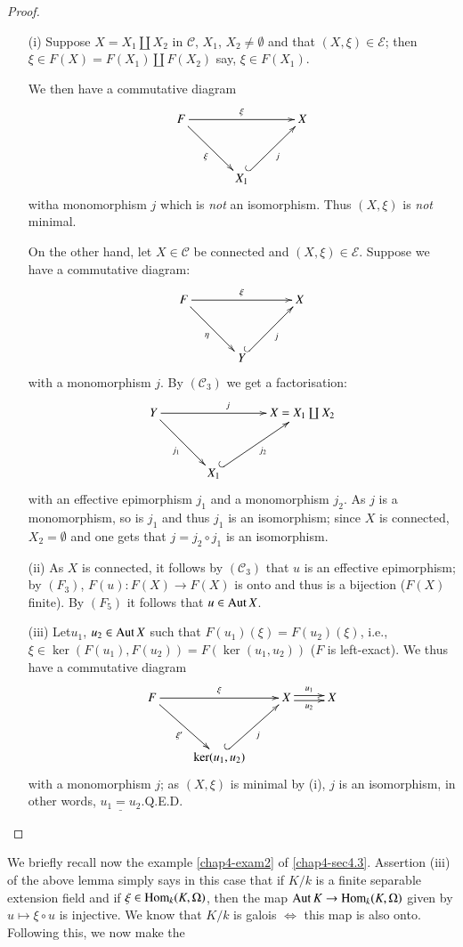 \begin{proof}
\begin{itemize}
\item[(i)] Suppose $X=X_{1}\coprod X_{2}$ in $\mathscr{C}$, $X_{1}$,
  $X_{2}\neq \emptyset$ and that $(X,\xi)\in \mathscr{E}$; then $\xi
  \in F(X)=F(X_{1})\coprod F(X_{2})$ say, $\xi \in F(X_{1})$. 

We then have a commutative diagram
\[
\xymatrix@=1.2cm{
F\ar[rr]^{\xi}\ar[dr]_{\xi} & & X\\
 & X_{1}\ar@{^{(}->}[ur]_{j} &
}
\]
with\pageoriginale a monomorphism $j$ which is {\em not} an
isomorphism. Thus $(X,\xi)$ is {\em not} minimal.


On the other hand, let $X\in\mathscr{C}$ be connected and
$(X,\xi)\in\mathscr{E}$. Suppose we have a commutative diagram:
\[
\xymatrix@=1.2cm{
F\ar[rr]^{\xi}\ar[dr]_{\eta} & & X\\
 & Y\ar@{^{(}->}[ur]_{j} &
}
\]
with a monomorphism $j$. By $(\mathscr{C}_{3})$ we get a
factorisation:
\[
\xymatrix@=1.2cm{
Y\ar[rr]^{j}\ar[dr]_{j_{1}} & & X=X_{1}\coprod X_{2}\\
 & X_{1}\ar@{^{(}->}[ur]_{j_{2}} &
}
\]
with an effective epimorphism $j_{1}$ and a monomorphism $j_{2}$. As
$j$ is a monomorphism, so is $j_{1}$ and thus $j_{1}$ is an
isomorphism; since $X$ is connected, $X_{2}=\emptyset$ and one gets
that $j=j_{2}\circ j_{1}$ is an isomorphism.

\item[(ii)] As $X$ is connected, it follows by $(\mathscr{C}_{3})$
  that $u$ is an effective epimorphism; by $(F_{3})$, $F(u):F(X)\to
  F(X)$ is onto and thus is a bijection ($F(X)$ finite). By $(F_{5})$
  it follows that $u\in \operatorname{Aut} X$.

\item[(iii)] Let\pageoriginale $u_{1}$, $u_{2}\in \operatorname{Aut} X$ such that
  $F(u_{1})(\xi)=F(u_{2})(\xi)$, i.e., $\xi\in \ker
  (F(u_{1}),F(u_{2}))=F(\ker(u_{1},u_{2}))$ ($F$ is left-exact). We
  thus have a commutative diagram
\[
\xymatrix@R=1.2cm{
F\ar[rr]^{\xi}\ar[dr]_{\xi'} & & X\ar@<.2em>[r]^{u_{1}}\ar@<-.2em>[r]_{u_{2}} &X\\
 & \ker (u_{1},u_{2})\ar@{^{(}->}[ur]_{j} & & 
}
\]
with a monomorphism $j$; as $(X,\xi)$ is minimal by (i), $j$ is an
isomorphism, in other words, $\underline{u_{1}=u_{2}}$.\hfill Q.E.D.
\end{itemize}
\end{proof}

We briefly recall now the example \ref{chap4-exam2} of
\ref{chap4-sec4.3}. Assertion (iii) of the above lemma simply says in this
case that if $K/k$ is a finite separable extension field and if
$\xi\in \operatorname{Hom}_{k}(K,\Omega)$, then the map $\operatorname{Aut} K\to
\operatorname{Hom}_{k}(K,\Omega)$ given by $u\mapsto \xi\circ u$ is injective. We
know that $K/k$ is galois $\Leftrightarrow$ this map is also
onto. Following this, we now make the

